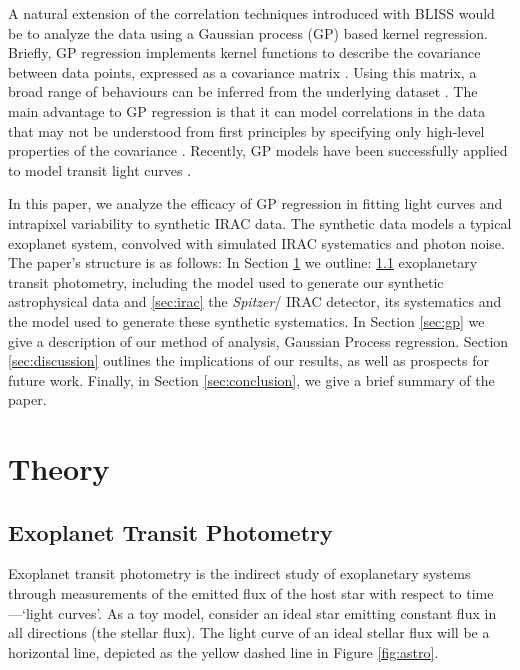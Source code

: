 \documentclass[twocolumn]{aastex61}
\begin{document}
A natural extension of the correlation techniques introduced with BLISS would be to analyze the data using a Gaussian process (GP) based kernel regression. Briefly, GP regression implements kernel functions to describe the covariance between data points, expressed as a covariance matrix \citep{rasmussen2006}. Using this matrix, a broad range of behaviours can be inferred from the underlying dataset \citep{rasmussen2006,evans2015}. The main advantage to GP regression is that it can model correlations in the data that may not be understood from first principles by specifying only high-level properties of the covariance \citep{evans2015}. Recently, GP models have been successfully applied to model transit light curves \citep[e.g.][]{gibson2012a,gibson2012b,gibson2013a,gibson2013b,evans2013,gibson2014}.

In this paper, we analyze the efficacy of GP regression in fitting light curves and intrapixel variability to synthetic IRAC data. The synthetic data models a typical exoplanet system, convolved with simulated IRAC systematics and photon noise. The paper's structure is as follows: In Section \ref{sec:theory} we outline: \ref{sec:photometry} exoplanetary transit photometry, including the model used to generate our synthetic astrophysical data and \ref{sec:irac} the \textit{Spitzer}/ IRAC detector, its systematics and the model used to generate these synthetic systematics. In Section \ref{sec:gp} we give a description of our method of analysis, Gaussian Process regression. Section \ref{sec:discussion} outlines the implications of our results, as well as prospects for future work. Finally, in Section \ref{sec:conclusion}, we give a brief summary of the paper.

\section{Theory}
\label{sec:theory}
\subsection{Exoplanet Transit Photometry}
\label{sec:photometry}
Exoplanet transit photometry is the indirect study of exoplanetary systems through measurements of the emitted flux of the host star with respect to time---`light curves'. As a toy model, consider an ideal star emitting constant flux in all directions (the stellar flux). The light curve of an ideal stellar flux will be a horizontal line, depicted as the yellow dashed line in Figure \ref{fig:astro}.
\end{document}

